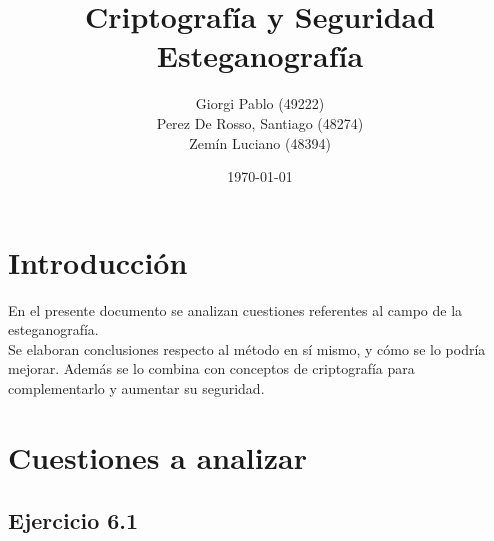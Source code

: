 \documentclass{article}
\begin{document}

\title{Criptografía y Seguridad\\ Esteganografía}
\author{Giorgi Pablo (49222) \\  Perez De Rosso, Santiago (48274) \\ Zemín Luciano (48394) 
}
\date{\today}
\maketitle

\tableofcontents

\section{Introducción}

\noindent En el presente documento se analizan cuestiones referentes al campo de la esteganografía. \\
Se elaboran conclusiones respecto al método en sí mismo, y cómo se lo podría mejorar. Además se lo combina con conceptos de criptografía para complementarlo y aumentar su seguridad.

\section{Cuestiones a analizar}

\subsection{Ejercicio 6.1}
\end{document}
